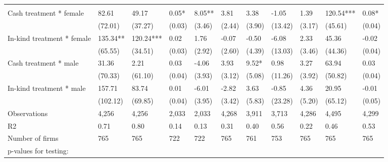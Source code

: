 \documentclass{report}
\begin{document}
\begin{table}[H]
{\begin{tabular}{lllllllllll}
\cmidrule(l{3pt}r{3pt}){2-2} \cmidrule(l{3pt}r{3pt}){3-3} \cmidrule(l{3pt}r{3pt}){4-4} \cmidrule(l{3pt}r{3pt}){5-5} \cmidrule(l{3pt}r{3pt}){6-6} \cmidrule(l{3pt}r{3pt}){7-7} \cmidrule(l{3pt}r{3pt}){8-8} \cmidrule(l{3pt}r{3pt}){9-9} \cmidrule(l{3pt}r{3pt}){10-10} \cmidrule(l{3pt}r{3pt}){11-11}
\addlinespace[0.3em]
\multicolumn{11}{l}{\textbf{Panel A: Males and females}}\\
\hspace{1em}Cash treatment * female & 82.61 & 49.17 & 0.05* & 8.05** & 3.81 & 3.38 & -1.05 & 1.39 & 120.54*** & 0.08*\\
\hspace{1em} & (72.01) & (37.27) & (0.03) & (3.46) & (2.44) & (3.90) & (13.42) & (3.17) & (45.61) & (0.04)\\
\hspace{1em}In-kind treatment * female & 135.34** & 120.24*** & 0.02 & 1.76 & -0.07 & -0.50 & -6.08 & 2.33 & 45.36 & -0.02\\
\hspace{1em} & (65.55) & (34.51) & (0.03) & (2.92) & (2.60) & (4.39) & (13.03) & (3.46) & (44.36) & (0.04)\\
\hspace{1em}Cash treatment * male & 31.36 & 2.21 & 0.03 & -4.06 & 3.93 & 9.52* & 0.98 & 3.27 & 63.94 & 0.03\\
\hspace{1em} & (70.33) & (61.10) & (0.04) & (3.93) & (3.12) & (5.08) & (11.26) & (3.92) & (50.82) & (0.04)\\
\hspace{1em}In-kind treatment * male & 157.71 & 83.74 & 0.01 & -6.01 & -2.82 & 3.63 & -0.85 & 4.36 & 20.95 & -0.01\\
\hspace{1em} & (102.12) & (69.85) & (0.04) & (3.95) & (3.42) & (5.83) & (23.28) & (5.20) & (65.12) & (0.05)\\
\hspace{1em}Observations & 4,256 & 4,256 & 2,033 & 2,033 & 4,268 & 3,911 & 3,713 & 4,286 & 4,495 & 4,299\\
\hspace{1em}R2 & 0.71 & 0.80 & 0.14 & 0.13 & 0.31 & 0.40 & 0.56 & 0.22 & 0.46 & 0.53\\
\hspace{1em}Number of firms & 765 & 765 & 722 & 722 & 765 & 761 & 753 & 765 & 765 & 765\\
\hspace{1em}p-values for testing: &  &  &  &  &  &  &  &  &  \vphantom{1}& \\

\end{tabular}}
\end{table}
\end{document}

